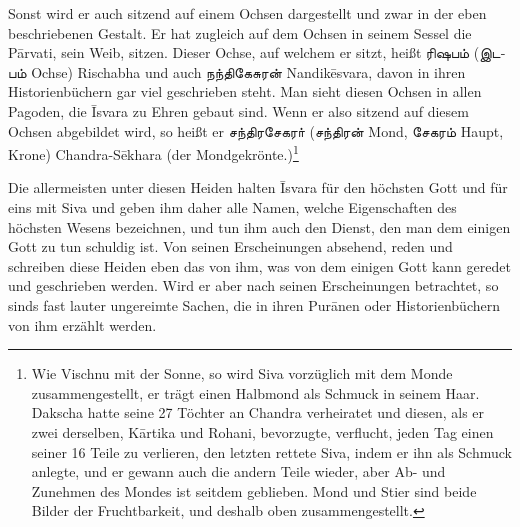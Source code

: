 \documentclass{article}
\newcommand{\TamilText}[1]{\texttamil{#1}}
\newcommand{\tam}[1]{\TamilText{#1}}
\begin{document}
Sonst wird er auch sitzend auf einem Ochsen dargestellt und zwar in der eben beschriebenen Gestalt. Er hat zugleich auf dem Ochsen in seinem Sessel die P\={a}rvati, sein Weib, sitzen. Dieser Ochse, auf welchem er sitzt, heißt \tam{ரிஷபம்} (\tam{இடபம்} Ochse) Rischabha und auch \tam{நந்திகேசுரன்} Nandik\={e}svara, davon in ihren Historienbüchern gar viel geschrieben steht. Man sieht diesen Ochsen in allen Pagoden, die \={I}svara zu Ehren gebaut sind. Wenn er also sitzend auf diesem Ochsen abgebildet wird, so heißt er \tam{சந்திரசேகரா்} (\tam{சந்திரன்} Mond, \tam{சேகரம்} Haupt, Krone) Chandra-S\={e}khara (der Mondgekrönte.)\footnote{Wie Vischnu mit der Sonne, so wird Siva vorzüglich mit dem Monde zusammengestellt, er trägt einen Halbmond als Schmuck in seinem Haar. Dakscha hatte seine 27 Töchter an Chandra verheiratet und diesen, als er zwei derselben, K\={a}rtika und Rohani, bevorzugte, verflucht, jeden Tag einen seiner 16 Teile zu verlieren, den letzten rettete Siva, indem er ihn als Schmuck anlegte, und er gewann auch die andern Teile wieder, aber Ab- und Zunehmen des Mondes ist seitdem geblieben. Mond und Stier sind beide Bilder der Fruchtbarkeit, und deshalb oben zusammengestellt.}

Die allermeisten unter diesen Heiden halten \={I}svara für den höchsten Gott und für eins mit Siva und geben ihm daher alle Namen, welche Eigenschaften des höchsten Wesens bezeichnen, und tun ihm auch den Dienst, den man dem einigen Gott zu tun schuldig ist. Von seinen Erscheinungen absehend, reden und schreiben diese Heiden eben das von ihm, was von dem einigen Gott kann geredet und geschrieben werden. Wird er aber nach seinen Erscheinungen betrachtet, so sinds fast lauter ungereimte Sachen, die in ihren Pur\={a}nen oder Historienbüchern von ihm erzählt werden.
\end{document}
